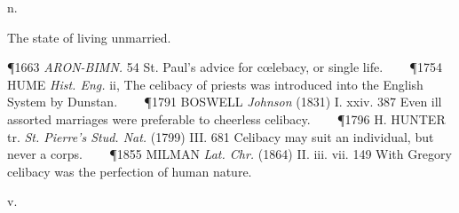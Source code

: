 \begin{description}[wide, labelwidth=!, labelindent=0pt]










 n.

\noindent {}



\noindent
The state of living unmarried.

\P 1663 \textit{ARON-BIMN.}  54 St. Paul's advice for cœlebacy, or single life.    
\P 1754 HUME  \textit{Hist. Eng.} ii, The celibacy of priests was introduced into the English System by Dunstan.    
\P 1791 BOSWELL  \textit{Johnson} (1831) I. xxiv. 387 Even ill assorted marriages were preferable to cheerless celibacy.    
\P 1796 H. HUNTER tr. \textit{St. Pierre's Stud. Nat.} (1799) III. 681 Celibacy may suit an individual, but never a corps.    
\P 1855 MILMAN  \textit{Lat. Chr.} (1864) II. iii. vii. 149 With Gregory celibacy was the perfection of human nature.


 v.

\noindent {}


\end{description}
